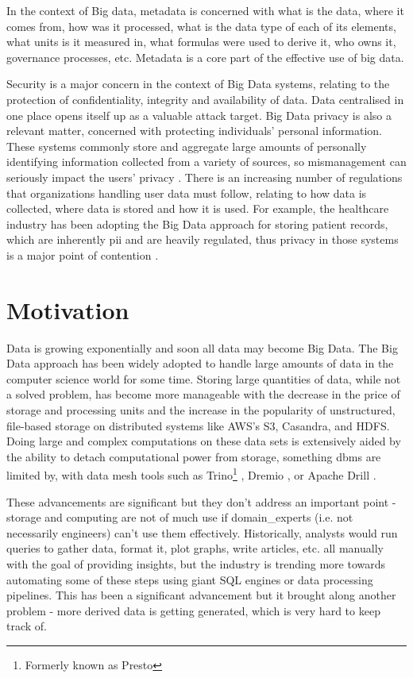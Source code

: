 In the context of Big data, metadata is concerned with what is the data, where it comes from, how was it processed, what is the data type of each of its elements, what units is it measured in, what formulas were used to derive it, who owns it, governance processes, etc. Metadata is a core part of the effective use of big data.

Security is a major concern in the context of Big Data systems, relating to the protection of confidentiality, integrity and availability of data. Data centralised in one place opens itself up as a valuable attack target. Big Data privacy is also a relevant matter, concerned with protecting individuals' personal information. These systems commonly store and aggregate large amounts of personally identifying information collected from a variety of sources, so mismanagement can seriously impact the users' privacy \cite{bigDataSecurityTankard20125}. There is an increasing number of regulations that organizations handling user data must follow, relating to how data is collected, where data is stored and how it is used. For example, the healthcare industry has been adopting the Big Data approach for storing patient records, which are inherently \acrshort{pii} and are heavily regulated, thus privacy in those systems is a major point of contention \cite{bigDataSecurityHealthPatil2014}.

\section{Motivation}

Data is growing exponentially and soon all data may become Big Data. The Big Data approach has been widely adopted to handle large amounts of data in the computer science world for some time. Storing large quantities of data, while not a solved problem, has become more manageable with the decrease in the price of storage and processing units and the increase in the popularity of unstructured, file-based storage on distributed systems like AWS’s S3, Casandra, and HDFS. Doing large and complex computations on these data sets is extensively aided by the ability to detach computational power from storage, something \acrshort{dbms} are limited by, with data mesh tools such as Trino\footnote{Formerly known as Presto} \cite{trinoTech, trinoSethi2019}, Dremio \cite{dremioTech}, or Apache Drill \cite{apacheDrillTech, apacheDrillHausenblas2013}.

These advancements are significant but they don’t address an important point - storage and computing are not of much use if \glspl{domain_expert} (i.e. not necessarily engineers) can't use them effectively. Historically, analysts would run queries to gather data, format it, plot graphs, write articles, etc. all manually with the goal of providing insights, but the industry is trending more towards automating some of these steps using giant SQL engines or data processing pipelines. This has been a significant advancement but it brought along another problem - more derived data is getting generated, which is very hard to keep track of.

